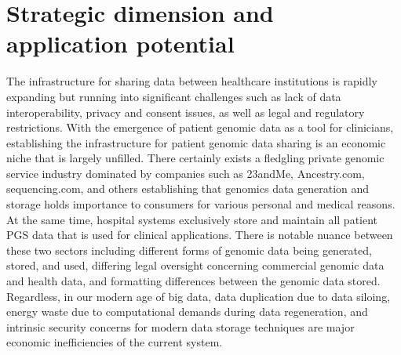 \documentclass[a4paper,11pt]{article}
\begin{document}
\begin{refsection}
\begin{ganttchart}
\end{ganttchart}


\section{Strategic dimension and application potential}
\begin{comment}
Elaborate the strategic dimension of your research, with regard to the (long-term) potential for innovative applications. 
Substantiate the PhD project’s strategic focus on economically relevant innovations. Justify how the chosen research approach (if successful) is the appropriate one to achieve the anticipated application(s) (potentially long term).
Elaborate the strategic importance of the potential applications to possible users (impact). Show how (if the project is successful) new products, services and/or processes may affect business of specific companies, a collective of companies and/or a sector and/or may be closely aligned with the Flemish science, technology and innovation transition priorities  (Flanders in transition. Priorities in Science, Technology and Innovation towards 2025) (socio-economic benefits). Societal impact should always be linked to a (in)direct (macro)economic benefit, e.g. cost reductions in health care, higher education level, environmental impact etc. should be positioned in an economic context.
\end{comment}
\smallskip

The infrastructure for sharing data between healthcare institutions is rapidly expanding but running into significant challenges such as lack of data interoperability, privacy and consent issues, as well as legal and regulatory restrictions. 
With the emergence of patient genomic data as a tool for clinicians, establishing the infrastructure for patient genomic data sharing is an economic niche that is largely unfilled. 
There certainly exists a fledgling private genomic service industry dominated by companies such as 23andMe, Ancestry.com, sequencing.com, and others establishing that genomics data generation and storage holds importance to consumers for various personal and medical reasons. 
At the same time, hospital systems exclusively store and maintain all patient PGS data that is used for clinical applications. 
There is notable nuance between these two sectors including different forms of genomic data being generated, stored, and used, differing legal oversight concerning commercial genomic data and health data, and formatting differences between the genomic data stored. 
Regardless, in our modern age of big data, data duplication due to data siloing, energy waste due to computational demands during data regeneration, and intrinsic security concerns for modern data storage techniques are major economic inefficiencies of the current system. 


\end{refsection}
\end{document}
